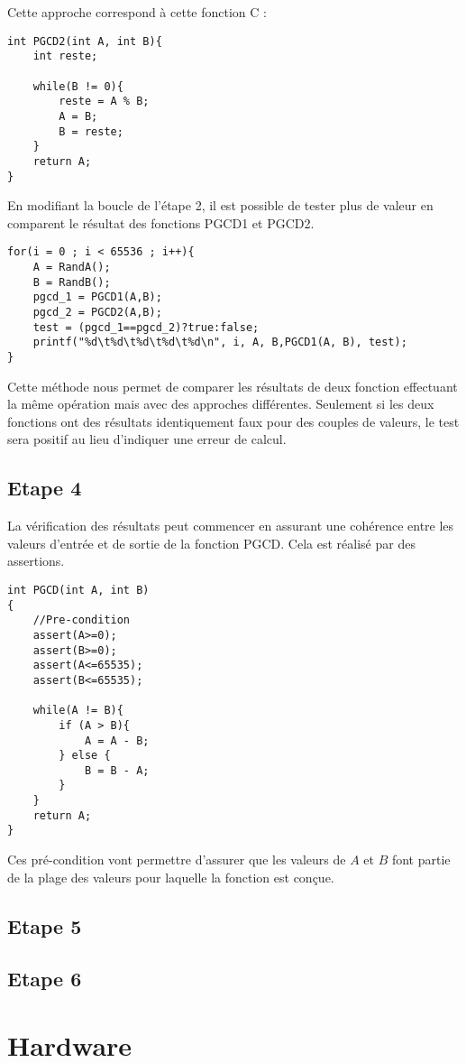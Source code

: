 \documentclass[a4paper]{article}
\begin{document}
        Cette approche correspond à cette fonction C :
\begin{lstlisting}[style=CStyle]
int PGCD2(int A, int B){
	int reste;

	while(B != 0){
		reste = A % B;
		A = B;
		B = reste;
	}
	return A;
}
\end{lstlisting}
        En modifiant la boucle de l'étape 2, il est possible de tester plus de valeur en comparent le résultat des fonctions PGCD1 et PGCD2.
\begin{lstlisting}[style=CStyle]
for(i = 0 ; i < 65536 ; i++){
	A = RandA();
	B = RandB();
	pgcd_1 = PGCD1(A,B);
	pgcd_2 = PGCD2(A,B);
	test = (pgcd_1==pgcd_2)?true:false;
	printf("%d\t%d\t%d\t%d\t%d\n", i, A, B,PGCD1(A, B), test);
}
\end{lstlisting}
        Cette méthode nous permet de comparer les résultats de deux fonction effectuant la même opération mais avec des approches différentes. Seulement si les deux fonctions ont des résultats identiquement faux pour des couples de valeurs, le test sera positif au lieu d'indiquer une erreur de calcul.
    \newpage
    \subsection{Etape 4}
        La vérification des résultats peut commencer en assurant une cohérence entre les valeurs d'entrée et de sortie de la fonction PGCD. Cela est réalisé par des assertions.
 \begin{lstlisting}[style=CStyle]
int PGCD(int A, int B)
{
    //Pre-condition
	assert(A>=0);
	assert(B>=0);
	assert(A<=65535);
	assert(B<=65535);
	
	while(A != B){
		if (A > B){
			A = A - B;
		} else {
			B = B - A;
		}
	}
	return A;
}
\end{lstlisting}
         Ces pré-condition vont permettre d'assurer que les valeurs de $A$ et $B$ font partie de la plage des valeurs pour laquelle la fonction est conçue.

    \subsection{Etape 5}
        
    \subsection{Etape 6}
    
\section{Hardware}
\end{document}
